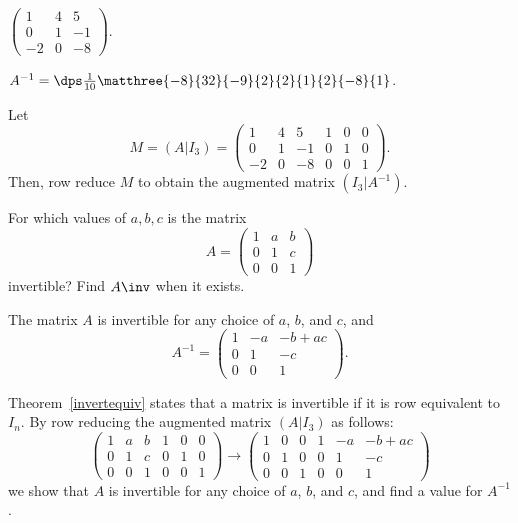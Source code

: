 \documentclass{article}
\begin{document}
\begin{exercise} \label{c4.9.3a}
$\left(\begin{array}{rrr} 1 & 4 & 5\\ 0 & 1 & -1\\ -2 & 0 & -8
\end{array}\right)$.

\begin{solution}
\ans
$A^{-1} = \dps\frac{1}{10}\matthree{-8}{32}{-9}{2}{2}{1}{2}
{-8}{1}$.

\soln Let
\[
M = (A|I_3) = \left(\begin{array}{rrr|rrr} 1 & 4 & 5 & 1 & 0 & 0 \\
0 & 1 & -1 & 0 & 1 & 0 \\
-2 & 0 & -8 & 0 & 0 & 1 \end{array}\right).
\]
Then, row reduce $M$ to obtain the augmented matrix $(I_3|A^{-1})$.

\end{solution}
\end{exercise}





\problemlabel

\begin{exercise} \label{c4.9.6}
For which values of $a,b,c$ is the matrix
\[
A =\left(\begin{array}{rrr} 1 & a & b\\ 0 & 1 & c\\ 0 & 0 & 1
\end{array}\right)
\]
invertible?  Find $A\inv$ when it exists.

\begin{solution}

\ans
The matrix $A$ is invertible for any choice of $a$, $b$, and $c$, and
\[
A^{-1} = \left(\begin{array}{rrc} 1 & -a & -b + ac \\ 0 & 1 & -c 
\\ 0 & 0 & 1 \end{array}\right).
\]

\soln Theorem~\ref{invertequiv} states that a matrix is invertible if
it is row equivalent to $I_n$.  By row reducing the augmented matrix
$(A|I_3)$ as follows:
\[
\left(\begin{array}{rrr|rrr} 1 & a & b & 1 & 0 & 0 \\
0 & 1 & c & 0 & 1 & 0 \\ 0 & 0 & 1 & 0 & 0 & 1
\end{array}\right) \rightarrow \left(\begin{array}{rrr|rrc}
1 & 0 & 0 & 1 & -a & -b + ac \\ 0 & 1 & 0 & 0 & 1 & -c \\
0 & 0 & 1 & 0 & 0 & 1 \end{array}\right)
\]
we show that $A$ is invertible for any choice of $a$, $b$, and
$c$, and find a value for $A^{-1}$.

\end{solution}
\end{exercise}
\end{document}
